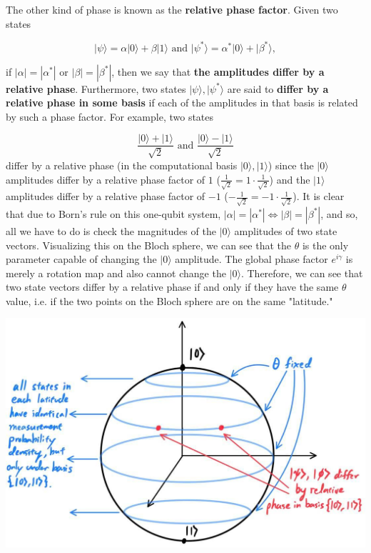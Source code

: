 \documentclass{article}
\theoremstyle{definition}
\begin{document}
      



      The other kind of phase is known as the \textbf{relative phase factor}. Given two states

        \[|\psi \rangle = \alpha |0\rangle + \beta |1\rangle \text{ and } |\psi^* \rangle = \alpha^* |0 \rangle + | \beta^* \rangle,\]

      if $|\alpha| = |\alpha^*|$ or $|\beta| = |\beta^*|$, then we say that \textbf{the amplitudes differ by a relative phase}. Furthermore, two states $|\psi \rangle, |\psi^* \rangle$ are said to \textbf{differ by a relative phase in some basis} if each of the amplitudes in that basis is related by such a phase factor. For example, two states 

      \[\frac{|0\rangle + |1\rangle}{\sqrt{2}} \text{ and } \frac{|0\rangle - |1\rangle}{\sqrt{2}}\]
      differ by a relative phase (in the computational basis $|0\rangle, |1\rangle$) since the $|0\rangle$ amplitudes differ by a relative phase factor of $1$ ($ \frac{1}{\sqrt{2}} = 1 \cdot \frac{1}{\sqrt{2}}$) and the $|1\rangle$ amplitudes differ by a relative phase factor of $-1$ ($-\frac{1}{\sqrt{2}} = -1 \cdot \frac{1}{\sqrt{2}}$). It is clear that due to Born's rule on this one-qubit system, $|\alpha| = |\alpha^*| \iff |\beta| = |\beta^*|$, and so, all we have to do is check the magnitudes of the $|0\rangle$ amplitudes of two state vectors. Visualizing this on the Bloch sphere, we can see that the $\theta$ is the only parameter capable of changing the $|0\rangle$ amplitude. The global phase factor $e^{i\gamma}$ is merely a rotation map and also cannot change the $|0\rangle$. Therefore, we can see that two state vectors differ by a relative phase if and only if they have the same $\theta$ value, i.e. if the two points on the Bloch sphere are on the same "latitude."

      \begin{center} 
        \includegraphics[scale=0.3]{img/Bloch_Sphere_latitude.jpg}
      \end{center}
\end{document}
